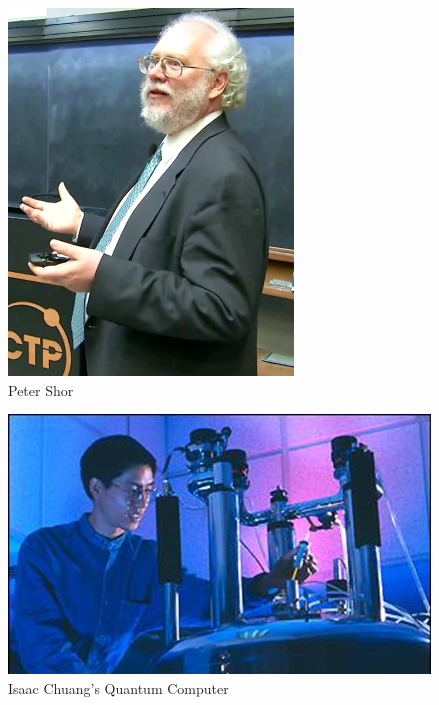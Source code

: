 \documentclass[conference]{IEEEtran}
\begin{document}
\begin{figure}[htbp]
\centerline{\includegraphics{peter_shor.png}}
\caption{Peter Shor}
\label{fig1}
\end{figure}

\begin{figure}[htbp]
	\centerline{\includegraphics[scale=0.8]{chaung.png}}
	\caption{Isaac Chuang's Quantum Computer}
	\label{fig2}
\end{figure}
\end{document}
